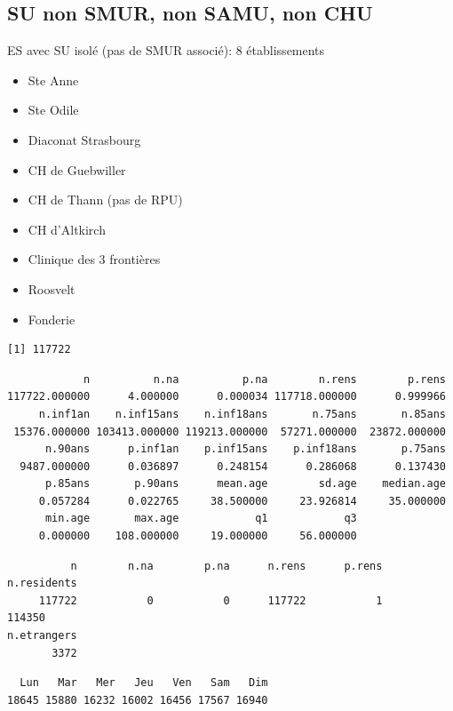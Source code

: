 \documentclass[]{article}
\begin{document}
\subsection{SU non SMUR, non SAMU, non
CHU}\label{su-non-smur-non-samu-non-chu}

ES avec SU isolé (pas de SMUR associé): 8 établissements

\begin{itemize}
\itemsep1pt\parskip0pt
\item
  Ste Anne
\item
  Ste Odile
\item
  Diaconat Strasbourg
\item
  CH de Guebwiller
\item
  CH de Thann (pas de RPU)
\item
  CH d'Altkirch
\item
  Clinique des 3 frontières
\item
  Roosvelt
\item
  Fonderie
\end{itemize}

\begin{verbatim}
[1] 117722
\end{verbatim}

\begin{verbatim}
            n          n.na          p.na        n.rens        p.rens 
117722.000000      4.000000      0.000034 117718.000000      0.999966 
     n.inf1an    n.inf15ans    n.inf18ans       n.75ans       n.85ans 
 15376.000000 103413.000000 119213.000000  57271.000000  23872.000000 
      n.90ans      p.inf1an    p.inf15ans    p.inf18ans       p.75ans 
  9487.000000      0.036897      0.248154      0.286068      0.137430 
      p.85ans       p.90ans      mean.age        sd.age    median.age 
     0.057284      0.022765     38.500000     23.926814     35.000000 
      min.age       max.age            q1            q3 
     0.000000    108.000000     19.000000     56.000000 
\end{verbatim}

\begin{verbatim}
          n        n.na        p.na      n.rens      p.rens n.residents 
     117722           0           0      117722           1      114350 
n.etrangers 
       3372 
\end{verbatim}

\begin{verbatim}
  Lun   Mar   Mer   Jeu   Ven   Sam   Dim 
18645 15880 16232 16002 16456 17567 16940 
\end{verbatim}
\end{document}
